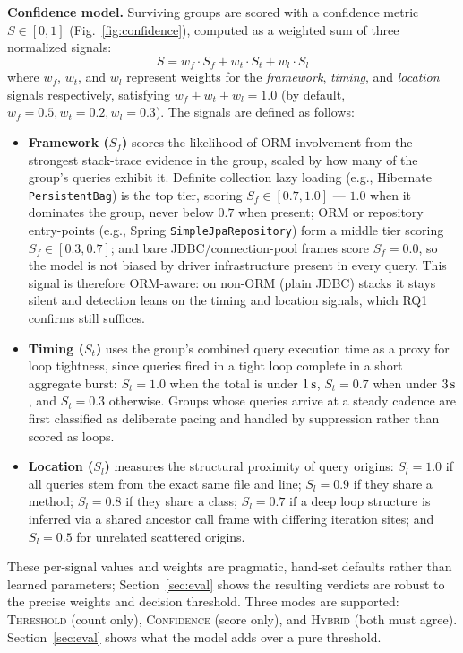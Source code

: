 \documentclass[sigplan,screen]{acmart}
\newcommand{\code}[1]{\texttt{\small #1}}
\begin{document}
\noindent\textbf{Confidence model.} Surviving groups are scored with a confidence metric $S \in [0, 1]$ (Fig.~\ref{fig:confidence}), computed as a weighted sum of three normalized signals:
\begin{equation}
  S = w_f \cdot S_f + w_t \cdot S_t + w_l \cdot S_l
\end{equation}
where $w_f$, $w_t$, and $w_l$ represent weights for the \emph{framework}, \emph{timing}, and \emph{location} signals respectively, satisfying $w_f + w_t + w_l = 1.0$ (by default, $w_f=0.5, w_t=0.2, w_l=0.3$).
The signals are defined as follows:
\begin{itemize}[leftmargin=*,topsep=1pt,itemsep=1pt]
  \item \textbf{Framework ($S_f$)} scores the likelihood of ORM involvement from the strongest stack-trace evidence in the group, scaled by how many of the group's queries exhibit it. Definite collection lazy loading (e.g., Hibernate \code{PersistentBag}) is the top tier, scoring $S_f \in [0.7, 1.0]$ --- $1.0$ when it dominates the group, never below $0.7$ when present; ORM or repository entry-points (e.g., Spring \code{SimpleJpaRepository}) form a middle tier scoring $S_f \in [0.3, 0.7]$; and bare JDBC/connection-pool frames score $S_f = 0.0$, so the model is not biased by driver infrastructure present in every query. This signal is therefore ORM-aware: on non-ORM (plain JDBC) stacks it stays silent and detection leans on the timing and location signals, which RQ1 confirms still suffices.
  \item \textbf{Timing ($S_t$)} uses the group's combined query execution time as a proxy for loop tightness, since queries fired in a tight loop complete in a short aggregate burst: $S_t = 1.0$ when the total is under $1\text{\,s}$, $S_t = 0.7$ when under $3\text{\,s}$, and $S_t = 0.3$ otherwise. Groups whose queries arrive at a steady cadence are first classified as deliberate pacing and handled by suppression rather than scored as loops.
  \item \textbf{Location ($S_l$)} measures the structural proximity of query origins: $S_l = 1.0$ if all queries stem from the exact same file and line; $S_l = 0.9$ if they share a method; $S_l = 0.8$ if they share a class; $S_l = 0.7$ if a deep loop structure is inferred via a shared ancestor call frame with differing iteration sites; and $S_l = 0.5$ for unrelated scattered origins.
\end{itemize}
These per-signal values and weights are pragmatic, hand-set defaults rather than learned parameters; Section~\ref{sec:eval} shows the resulting verdicts are robust to the precise weights and decision threshold. Three modes are supported: \textsc{Threshold} (count only), \textsc{Confidence} (score only), and \textsc{Hybrid} (both must agree). Section~\ref{sec:eval} shows what the model adds over a pure threshold.
\end{document}
